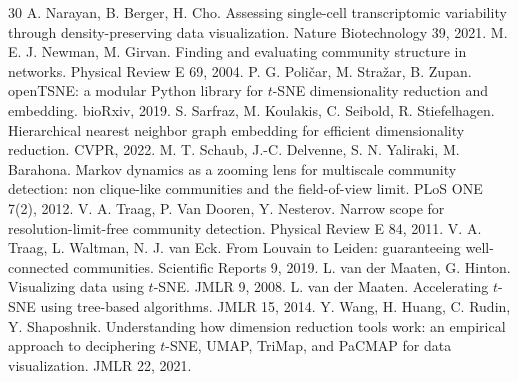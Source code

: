\documentclass[10pt,twocolumn]{article}
\begin{document}
\begin{thebibliography}{30}
 A. Narayan, B. Berger, H. Cho. Assessing single-cell transcriptomic variability through density-preserving data visualization. Nature Biotechnology 39, 2021.
 M. E. J. Newman, M. Girvan. Finding and evaluating community structure in networks. Physical Review E 69, 2004.
 P. G. Poli\v{c}ar, M. Stra\v{z}ar, B. Zupan. openTSNE: a modular Python library for $t$-SNE dimensionality reduction and embedding. bioRxiv, 2019.
 S. Sarfraz, M. Koulakis, C. Seibold, R. Stiefelhagen. Hierarchical nearest neighbor graph embedding for efficient dimensionality reduction. CVPR, 2022.
 M. T. Schaub, J.-C. Delvenne, S. N. Yaliraki, M. Barahona. Markov dynamics as a zooming lens for multiscale community detection: non clique-like communities and the field-of-view limit. PLoS ONE 7(2), 2012.
 V. A. Traag, P. Van Dooren, Y. Nesterov. Narrow scope for resolution-limit-free community detection. Physical Review E 84, 2011.
 V. A. Traag, L. Waltman, N. J. van Eck. From Louvain to Leiden: guaranteeing well-connected communities. Scientific Reports 9, 2019.
 L. van der Maaten, G. Hinton. Visualizing data using $t$-SNE. JMLR 9, 2008.
 L. van der Maaten. Accelerating $t$-SNE using tree-based algorithms. JMLR 15, 2014.
 Y. Wang, H. Huang, C. Rudin, Y. Shaposhnik. Understanding how dimension reduction tools work: an empirical approach to deciphering $t$-SNE, UMAP, TriMap, and PaCMAP for data visualization. JMLR 22, 2021.
\end{thebibliography}

\appendix
\end{document}
